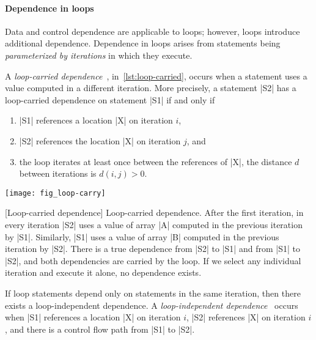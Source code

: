 \paragraph*{Dependence in loops}
Data and control dependence are applicable to loops;
however, loops introduce additional dependence.
Dependence in loops arises from statements being \emph{parameterized by iterations} in which they execute.

A \emph{loop-carried dependence}~\cite[p. 73]{kennedy2001}, in~\autoref{lst:loop-carried},
occurs when a statement uses a value computed in a different iteration.
More precisely, a statement \pr|S2| has a loop-carried dependence on statement \pr|S1| if and only if
\begin{enumerate}
\item \pr|S1| references a location \pr|X| on iteration \(i\),
\item \pr|S2| references the location \pr|X| on iteration \(j\), and
\item the loop iterates at least once between the references of \pr|X|, \ie the distance \(d\) between iterations is \(d(i, j) > 0\).
\end{enumerate}

\begin{center}
\captionsetup{type=lstlisting}
\begin{minipage}{.4\textwidth}
\end{minipage}%
\hfill%
\begin{minipage}{.5\textwidth}
{\centering\texttt{[image: fig\_loop-carry]}}
\end{minipage}
[Loop-carried dependence]{
Loop-carried dependence.
After the first iteration, in every iteration \pr|S2| uses a value of array \pr|A| computed in the previous iteration by \pr|S1|.
Similarly, \pr|S1| uses a value of array \pr|B| computed in the previous iteration by \pr|S2|.
There is a true dependence from \pr|S2| to \pr|S1| and from \pr|S1| to \pr|S2|, and both dependencies are carried by the loop.
If we select any individual iteration and execute it alone, no dependence exists.
}\label{lst:loop-carried}
\end{center}

If loop statements depend only on statements in the {same iteration}, then there exists a loop-independent dependence.
A \emph{loop-independent dependence}~\cite[p. 76]{kennedy2001} occurs when
\pr|S1| references a location \pr|X| on iteration \(i\),
\pr|S2| references \pr|X| on iteration \(i\),
and there is a control flow path from \pr|S1| to \pr|S2|.


